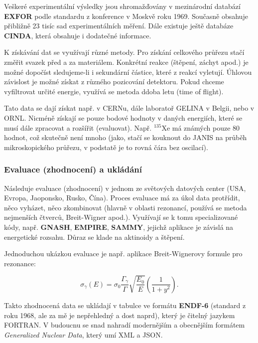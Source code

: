 Veškeré experimentální výsledky jsou shromažďovány v mezinárodní databází \textbf{EXFOR} podle standardu z konference v Moskvě roku 1969. Současně obsahuje přibližně 23 tisíc sad experimentálních měření. Dále existuje ještě databáze \textbf{CINDA}, která obsahuje i dodatečné informace. 

K získávání dat se využívají různé metody. Pro získání celkového průřezu stačí změřit svazek před a za materiálem. Konkrétní reakce (štěpení, záchyt apod.) je možné dopočíst sledujeme-li i sekundární částice, které z reakcí vyletují. Úhlovou závislost je možné získat z různého pozicování detektoru. Pokud chceme vyfiltrovat určité energie, využívá se metoda ddoba letu (time of flight).

Tato data se dají získat např. v CERNu, dále laboratoř GELINA v Belgii, nebo v ORNL. Nicméně získají se pouze bodové hodnoty v daných energiích, které se musí dále zpracovat a rozšířit (evaluovat). Např. $^{135}$Xe má známých pouze 80 hodnot, což skutečně není mnoho (jako, stačí se kouknout do JANIS na průběh mikroskopického průřezu, v podstatě je to rovná čára bez oscilací).

\subsubsection{Evaluace (zhodnocení) a ukládání}

Následuje evaluace (zhodnocení) v jednom ze světových datových center (USA, Evropa, Jaoponsko, Rusko, Čína). Proces evaluace má za úkol data protřídit, něco vyházet, něco zkombinovat (hlavně v oblasti rezonancí, používá se metoda nejmenších čtverců, Breit-Wigner apod.). Využívají se k tomu specializované kódy, např. \textbf{GNASH}, \textbf{EMPIRE}, \textbf{SAMMY}, jejichž aplikace je závislá na energetické rozsahu. Důraz se klade na aktinoidy a štěpení.

Jednoduchou ukázkou evaluace je např. aplikace Breit-Wignerovy formule pro rezonance:

\begin{equation}
  \sigma_\gamma(E) = \sigma_0 \dfrac{\Gamma_\gamma}{\Gamma} \sqrt{\dfrac{E_0}{E}} \left ( \dfrac{1}{1+y^2} \right ).
\end{equation}

Takto zhodnocená data se ukládají v tabulce ve formátu \textbf{ENDF-6} (standard z roku 1968, ale za mě je nepřehledný a dost naprd), který je čitelný jazykem FORTRAN. V budoucnu se snad  nahradí modernějším a obecnějším formátem \textit{Generalized Nuclear Data}, který umí XML a JSON.

